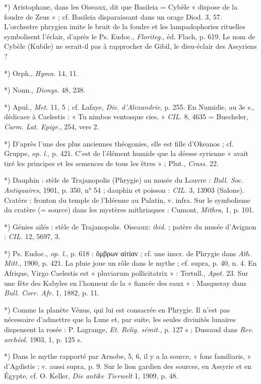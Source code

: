 \documentclass[a4paper, 11pt, oneside, polutonikogreek, french]{article}
\begin{document}
*) Aristophane, dans les Oiseaux, dit que Basileia = Cybèle « dispose de la foudre de Zeus » ; cf. Basileia disparaissant dans un orage Diod. 3, 57. L'orchestre phrygien imite le bruit de la foudre et les lampadophories rituelles symbolisent l'éclair, d'après le Ps. Eudoc., \emph{Floriteg.}, éd. Flach, p. 619. Le nom de Cybèle (Kubile) ne serait-il pas à rapprocher de Gibil, le dieu-éclair des Assyriens ? 

*) Orph., \emph{Hymn.} 14, 11.

*) Nonn., \emph{Dionys.} 48, 238.

*) Apul., \emph{Met.} 11, 5 ; cf. Lafaye, \emph{Div. d'Alexandrie}, p. 255. En Numidie, au 3e s., dédicace à Caelestis : « Tu nimbos ventosque cies, » \emph{CIL.} 8, 4635 = Buecheler, \emph{Carm. Lat. Epigr.}, 254, vers 2.

*) D'après l'une des plus anciennes théogonies, elle est fille d'Okeanos ; cf. Gruppe, \emph{op. l.}, p. 421. C'est de l'élément humide que la déesse syrienne « avait tiré les principes et les semences de tous les êtres » ; Plut., \emph{Crass.} 22.

*) Dauphin : stèle de Trajanopolis (Phrygie) au musée du Louvre : \emph{Bull. Soc. Antiquaires}, 1901, p. 350, n° 54 ; dauphin et poisson : \emph{CIL.} 3, 13903 (Salone). Cratère : fronton du temple de l'Idéenne au Palatin, v. infra. Sur le symbolisme du cratère (= source) dans les mystères mithriaques : Cumont, \emph{Mithra}, 1, p. 101.

*) Génies ailés : stèle de Trajanopolis. Oiseaux: \emph{ibid.} ; patère du musée d'Avignon : \emph{CIL.} 12, 5697, 3.

*) Ps. Eudoc., \emph{op. l.}, p. 618 : ὄμβρων αἰτίαν ; cf. une inscr. de Phrygie dans \emph{Ath. Mitt.}, 1900, p. 421. La pluie joue un rôle dans le mythe ; cf. supra, p. 40, n. 4. En Afrique, Virgo Caelestis est « pluviarum pollicitatrix » : Tertull., \emph{Apot.} 23. Sur une fête des Kabyles en l'honneur de la « fiancée des eaux » : Masqueray dans \emph{Bull. Corr. Afr.} 1, 1882, p. 11.

*) Comme la planète Vénus, qui lui est consacrée en Phrygie. Il n'est pas nécessaire d'admettre que la Lune et, par suite, les seules divinités lunaires dispensent la rosée : P. Lagrange, \emph{Et. Relig. sémit.}, p. 127 s ; Dussaud dans \emph{Rev. archéol.} 1903, 1, p. 125 s.

*) Dans le mythe rapporté par Arnobe, 5, 6, il y a la source, « fons familiaris, » d'Agdistis ; v. aussi supra, p. 9. Sur le lion gardien des sources, en Assyrie et en Égypte, cf. O. Keller, \emph{Die antike Tierwelt} 1, 1909, p. 48.
\end{document}

